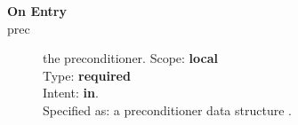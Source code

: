 

\begin{description}
\item[\bf On Entry]
\item[prec] the preconditioner.
Scope: {\bf local} \\
Type: {\bf required}\\
Intent: {\bf in}.\\
Specified as: a preconditioner data structure \precdata.
\end{description}



